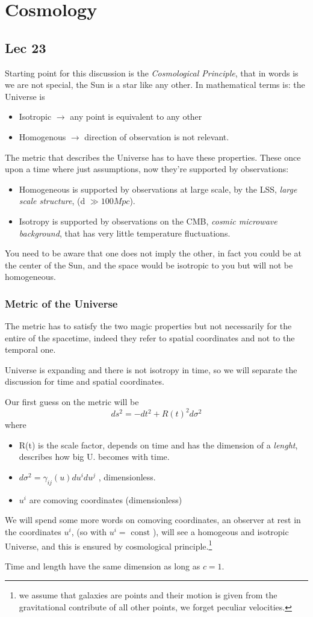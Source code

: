 \chapter{Cosmology}
\section{Lec 23}
Starting point for this discussion is the \emph{Cosmological Principle}, that in words is we are not special, the Sun is a star like any other. In mathematical terms is: the Universe is
\begin{itemize}
\item Isotropic $\to $ any point is equivalent to any other
\item Homogenous $\to $ direction of observation is not relevant.
\end{itemize}
The metric that describes the Universe has to have these properties. These once upon a time where just assumptions, now they're supported by observations:
\begin{itemize}
\item Homogeneous is supported by observations at large scale, by the LSS, \emph{large scale structure}, (d $\gg 100 Mpc$).
\item Isotropy is supported by observations on the CMB, \emph{cosmic microwave background}, that has very little temperature fluctuations.
\end{itemize}
You need to be aware that one does not imply the other, in fact you could be at the center of the Sun, and the space would be isotropic to you but will not be homogeneous.

\subsection{Metric of the Universe}
The metric has to satisfy the two magic properties but not necessarily for the entire of the spacetime, indeed they refer to spatial coordinates and not to the temporal one.\par
Universe is expanding and there is not isotropy in time, so we will separate the discussion for time and spatial coordinates.\par
Our first guess on the metric will be
\[
ds^{2} = -dt^{2} + R\left( t \right)^{2}d\sigma ^{2}
\]
where
\begin{itemize}
\item R(t) is the scale factor, depends on time and has the dimension of a \emph{lenght}, describes how big U. becomes with time.
\item $d\sigma ^{2}=\gamma _{ij}\left( u \right)du^{i}du^{j}$ , dimensionless.
\item $u^{i}$ are comoving coordinates (dimensionless)
\end{itemize}
We will spend some more words on comoving coordinates, an observer at rest in the coordinates $u^{i}$, (so with $u^{i} = \text{ const }$), will see a homogeous and isotropic Universe, and this is ensured by cosmological principle.\footnote{ we assume that galaxies are points and their motion is given from the gravitational contribute of all other points, we forget peculiar velocities. }\par
Time and length have the same dimension as long as $c = 1$.

